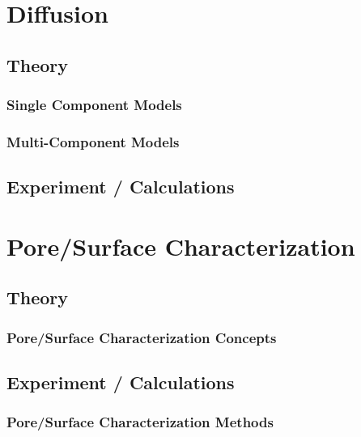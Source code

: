 \documentclass[11pt]{article}
\begin{document}
\section{Diffusion}
\label{sec:org2307ca8}

\subsection{Theory}
\label{sec:orgaebf7a3}

\subsubsection{Single Component Models}
\label{sec:orgb03a7f3}

\subsubsection{Multi-Component Models}
\label{sec:orge6bac03}

\subsection{Experiment / Calculations}
\label{sec:org7c6c266}

\section{Pore/Surface Characterization}
\label{sec:org8abd8ee}

\subsection{Theory}
\label{sec:org651450b}

\subsubsection{Pore/Surface Characterization Concepts}
\label{sec:org3a17397}

\subsection{Experiment / Calculations}
\label{sec:org017c5a7}

\subsubsection{Pore/Surface Characterization Methods}
\label{sec:org15859a2}
\end{document}
